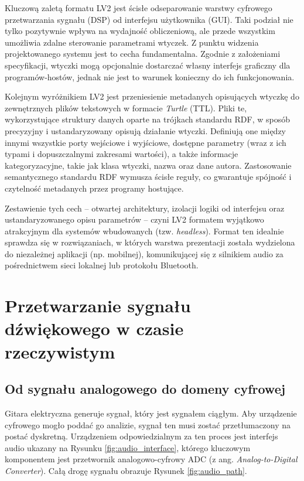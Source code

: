 \documentclass[12pt,a4paper]{report}
\begin{document}
Kluczową zaletą formatu LV2 jest ścisłe odseparowanie warstwy
cyfrowego przetwarzania sygnału (DSP) od interfejsu użytkownika
(GUI). Taki podział nie tylko pozytywnie wpływa na wydajność
obliczeniową, ale przede wszystkim umożliwia zdalne sterowanie
parametrami wtyczek. Z punktu widzenia projektowanego systemu jest to
cecha fundamentalna. Zgodnie z założeniami specyfikacji, wtyczki mogą
opcjonalnie dostarczać własny interfejs graficzny dla
programów-hostów, jednak nie jest to warunek konieczny do ich funkcjonowania.

Kolejnym wyróżnikiem LV2 jest przeniesienie metadanych opisujących
wtyczkę do zewnętrznych plików tekstowych w formacie \textit{Turtle}
(TTL). Pliki te, wykorzystujące struktury danych oparte na trójkach
standardu RDF\cite{rdf}, w sposób precyzyjny i ustandaryzowany
opisują działanie wtyczki. Definiują one między innymi wszystkie
porty wejściowe i wyjściowe, dostępne parametry (wraz z ich typami i
dopuszczalnymi zakresami wartości), a także informacje
kategoryzacyjne, takie jak klasa wtyczki, nazwa oraz dane autora.
Zastosowanie semantycznego standardu RDF wymusza ścisłe reguły,
co gwarantuje spójność i czytelność metadanych
przez programy hostujące.

Zestawienie tych cech – otwartej architektury, izolacji logiki od
interfejsu oraz ustandaryzowanego opisu parametrów – czyni LV2
formatem wyjątkowo atrakcyjnym dla systemów wbudowanych (tzw.
\textit{headless}). Format ten idealnie sprawdza się w rozwiązaniach,
w których warstwa prezentacji została wydzielona do niezależnej
aplikacji (np. mobilnej), komunikującej się z silnikiem audio za
pośrednictwem sieci lokalnej lub protokołu Bluetooth.

\chapter{Przetwarzanie sygnału dźwiękowego w czasie rzeczywistym}

\section{Od sygnału analogowego do domeny cyfrowej}

Gitara elektryczna generuje sygnał, który jest sygnałem ciągłym. Aby
urządzenie cyfrowego mogło poddać go analizie, sygnał ten musi zostać
przetłumaczony na postać dyskretną. Urządzeniem
odpowiedzialnym za ten proces jest interfejs audio ukazany na Rysunku
\ref{fig:audio_interface}, którego kluczowym komponentem jest
przetwornik analogowo-cyfrowy ADC (z ang. \textit{Analog-to-Digital
Converter}). Całą drogę sygnału obrazuje Rysunek \ref{fig:audio_path}.
\end{document}
